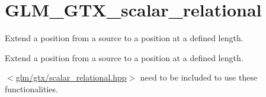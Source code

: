 \hypertarget{group__gtx__scalar__relational}{}\section{G\+L\+M\+\_\+\+G\+T\+X\+\_\+scalar\+\_\+relational}
\label{group__gtx__scalar__relational}


Extend a position from a source to a position at a defined length.  


Extend a position from a source to a position at a defined length. 

$<$\hyperlink{scalar__relational_8hpp}{glm/gtx/scalar\+\_\+relational.\+hpp}$>$ need to be included to use these functionalities. 